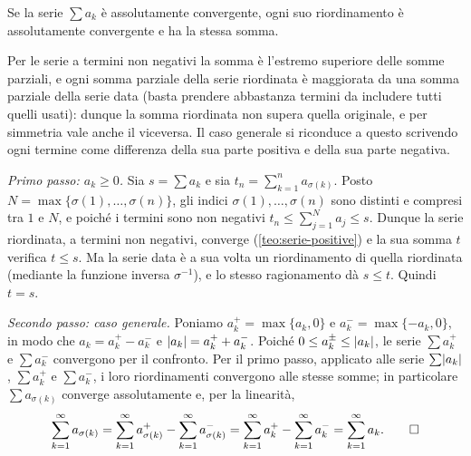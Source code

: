 \begin{teorema}[di Dirichlet]\label{teo:dirichlet-riordinamento}
Se la serie $\sum a_{k}$ è assolutamente convergente, ogni suo riordinamento è
assolutamente convergente e ha la stessa somma.
\end{teorema}

\begin{schema}
\end{schema}

\begin{strategia}
Per le serie a termini non negativi la somma è l'estremo superiore delle somme parziali,
e ogni somma parziale della serie riordinata è maggiorata da una somma parziale della
serie data (basta prendere abbastanza termini da includere tutti quelli usati): dunque la
somma riordinata non supera quella originale, e per simmetria vale anche il viceversa.
Il caso generale si riconduce a questo scrivendo ogni termine come differenza della sua
parte positiva e della sua parte negativa.
\end{strategia}

\begin{dimostrazione}
\emph{Primo passo: $a_{k}\ge0$.} Sia $s=\sum a_{k}$ e sia $t_{n}=\sum_{k=1}^{n}a_{\sigma(k)}$. Posto
$N=\max\{\sigma(1),\dots,\sigma(n)\}$, gli indici $\sigma(1),\dots,\sigma(n)$ sono distinti e compresi tra $1$ e $N$,
e poiché i termini sono non negativi $t_{n}\le\sum_{j=1}^{N}a_{j}\le s$. Dunque la serie riordinata, a
termini non negativi, converge (\cref{teo:serie-positive}) e la sua somma $t$ verifica
$t\le s$. Ma la serie data è a sua volta un riordinamento di quella riordinata (mediante
la funzione inversa $\sigma^{-1}$), e lo stesso ragionamento dà $s\le t$. Quindi $t=s$.

\emph{Secondo passo: caso generale.} Poniamo $a_{k}^{+}=\max\{a_{k},0\}$ e $a_{k}^{-}=\max\{-a_{k},0\}$, in modo
che $a_{k}=a_{k}^{+}-a_{k}^{-}$ e $\lvert a_{k}\rvert=a_{k}^{+}+a_{k}^{-}$. Poiché $0\le a_{k}^{\pm}\le\lvert a_{k}\rvert$, le serie $\sum a_{k}^{+}$ e
$\sum a_{k}^{-}$ convergono per il confronto. Per il primo passo, applicato alle serie
$\sum\lvert a_{k}\rvert$, $\sum a_{k}^{+}$ e $\sum a_{k}^{-}$, i loro riordinamenti convergono alle stesse somme; in
particolare $\sum a_{\sigma(k)}$ converge assolutamente e, per la linearità,
\[
  \sum_{k=1}^{\infty}a_{\sigma(k)}=\sum_{k=1}^{\infty}a_{\sigma(k)}^{+}-\sum_{k=1}^{\infty}a_{\sigma(k)}^{-}
  =\sum_{k=1}^{\infty}a_{k}^{+}-\sum_{k=1}^{\infty}a_{k}^{-}=\sum_{k=1}^{\infty}a_{k} . \qedhere
\]
\end{dimostrazione}

